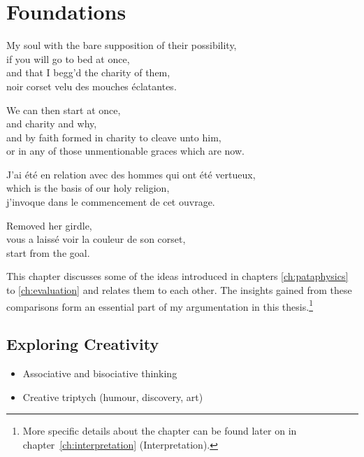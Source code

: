 
\chapter{Foundations}
\label{ch:foundations}

\startcontents[chapters]

My soul with the bare supposition of their possibility, \\
if you will go to bed at once, \\
and that I begg'd the charity of them, \\
noir corset velu des mouches éclatantes.

We can then start at once, \\
and charity and why, \\
and by faith formed in charity to cleave unto him, \\
or in any of those unmentionable graces which are now.

J'ai été en relation avec des hommes qui ont été vertueux, \\
which is the basis of our holy religion, \\
j'invoque dans le commencement de cet ouvrage.

Removed her girdle, \\
vous a laissé voir la couleur de son corset, \\
start from the goal.

\minicontents


This chapter discusses some of the ideas introduced in chapters \ref{ch:pataphysics} to \ref{ch:evaluation} and relates them to each other. The insights gained from these comparisons form an essential part of my argumentation in this thesis.\footnote{More specific details about the  chapter can be found later on in chapter~\ref{ch:interpretation} (Interpretation).}


\section{Exploring Creativity}

\begin{shaded}
  \begin{itemize}
    \item Associative and bisociative thinking
    \item Creative triptych (humour, discovery, art)
  \end{itemize}
\end{shaded}


